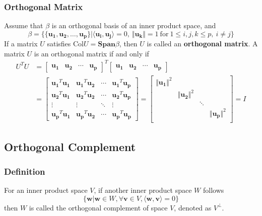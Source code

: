 \documentclass[11pt]{article}
\begin{document}
\subsubsection*{Orthogonal Matrix}
Assume that $\beta$ is an orthogonal basis of an inner product space, and
\begin{equation}
    \beta = \bigg\{ \{\bm{u_1},\bm{u_2},\dots,\bm{u_p}\} \bigg| \langle \bm{u_i}, \bm{u_j} \rangle = 0,~\Vert \bm{u_k} \Vert = 1~\text{for}~1\leq i,j,k \leq p,~i\neq j\bigg\}
\end{equation}
If a matrix $U$ satisfies $\text{Col}U = \bm{Span}\beta$, then $U$ is called an \textbf{orthogonal matrix}. A matrix $U$ is an orthogonal matrix if and only if
\begin{equation}
\begin{aligned}
    U^TU &= \begin{bmatrix}
    \bm{u_1} & \bm{u_2} & \cdots & \bm{u_p} 
    \end{bmatrix}^T \begin{bmatrix}
    \bm{u_1} & \bm{u_2} & \cdots & \bm{u_p}
    \end{bmatrix} \\
    &= \begin{bmatrix}
    \bm{u_1}^T\bm{u_1} & \bm{u_1}^T\bm{u_2} & \cdots & \bm{u_1}^T\bm{u_p} \\
    \bm{u_2}^T\bm{u_1} & \bm{u_2}^T\bm{u_2} & \cdots & \bm{u_2}^T\bm{u_p} \\
    \vdots & \vdots & \ddots & \vdots \\
    \bm{u_p}^T\bm{u_1} & \bm{u_p}^T\bm{u_2} & \cdots & \bm{u_p}^T\bm{u_p}
    \end{bmatrix} = \begin{bmatrix}
    \Vert \bm{u_1} \Vert^2 & & & \\
    & \Vert \bm{u_2} \Vert^2 & &  \\
    & & \ddots & \\
    & & & \Vert \bm{u_p} \Vert^2 \\
    \end{bmatrix} = I
\end{aligned}
\end{equation}
\subsection{Orthogonal Complement}
\subsubsection*{Definition}
For an inner product space $V$, if another inner product space $W$ follows
\begin{equation}
    \{\bm{w} | \bm{w} \in W, \forall \bm{v} \in V, \langle \bm{w},\bm{v} \rangle = 0 \} 
\end{equation}
then $W$ is called the orthogonal complement of space $V$, denoted as $V^{\perp}$. 
\end{document}

